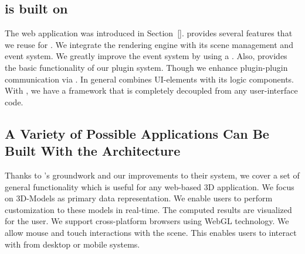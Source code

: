 \documentclass[../03-Architecture.tex]{subfiles}
\begin{document}


\subsection{{\convertify} is built on {\brickify}}
\label{sec:brickify-comparison}

The web application {\brickify} was introduced in
Section~\ref{}. {\brickify} provides several
features that we reuse for {\convertify}. We integrate the rendering
engine with its scene management and event system. We greatly improve
the event system by using a . Also, {\brickify}
provides the basic functionality of our plugin system. Though we
enhance plugin-plugin communication via . In general
{\brickify} combines UI-elements with its logic components. With
{\convertify}, we have a framework that is completely decoupled from
any user-interface code.

\subsection{A Variety of Possible Applications Can Be Built With the {\convertify} Architecture}
\label{sec:variety-of-applications}

Thanks to {\brickify}'s groundwork and our improvements to their
system, we cover a set of general functionality which is useful for
any web-based 3D application. We focus on 3D-Models as primary data
representation. We enable users to perform customization to these
models in real-time. The computed results are visualized for the user.
We support cross-platform browsers using WebGL technology. We allow
mouse and touch interactions with the scene. This enables users to
interact with {\convertify} from desktop or mobile systems.
\end{document}
